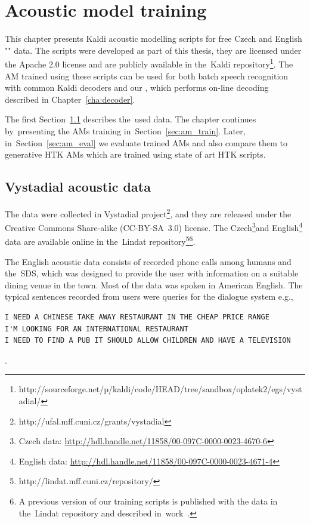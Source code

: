 \chapter{Acoustic model training}
\label{cha:train}

This chapter presents Kaldi acoustic modelling scripts for free Czech and English "" data.
The scripts were developed as part of this thesis, they are licensed under the Apache 2.0 license and are publicly available in the~Kaldi repository\footnote{http://sourceforge.net/p/kaldi/code/HEAD/tree/sandbox/oplatek2/egs/vystadial/}.
The \acf{AM} trained using these scripts can be used for both batch speech recognition with common Kaldi decoders and our , which performs on-line decoding described in Chapter~\ref{cha:decoder}.

The first Section~\ref{sec:data} describes the~used data. 
The chapter continues by~presenting the \acp{AM} training in~Section~\ref{sec:am_train}. 
Later, in~Section~\ref{sec:am_eval} we evaluate trained \acp{AM} and also compare them to generative \ac{HTK} \acp{AM} which are trained using state of art \ac{HTK} scripts.

\section{Vystadial acoustic data}
\label{sec:data}

The data were collected in Vystadial project\footnote{http://ufal.mff.cuni.cz/grants/vystadial}, and they are released under the Creative Commons Share-alike (CC-BY-SA~3.0) license. 
The Czech\footnote{Czech data: \url{http://hdl.handle.net/11858/00-097C-0000-0023-4670-6}}and English\footnote{English data: \url{http://hdl.handle.net/11858/00-097C-0000-0023-4671-4}} data are available online in the~Lindat repository\footnote{{http://lindat.mff.cuni.cz/repository/}}\footnote{A previous version of our training scripts is published with the data in the~Lindat repository and described in~work~\cite{korvas_2014}.}.

The English acoustic data consists of recorded phone calls among humans and the~\acl{SDS}, which was designed to provide the user with information on a suitable dining venue in the town.
Most of the data was spoken in American English.
The typical sentences recorded from users were queries for the dialogue system e.g.,
\begin{verbatim}
I NEED A CHINESE TAKE AWAY RESTAURANT IN THE CHEAP PRICE RANGE
I'M LOOKING FOR AN INTERNATIONAL RESTAURANT
I NEED TO FIND A PUB IT SHOULD ALLOW CHILDREN AND HAVE A TELEVISION
\end{verbatim}.

